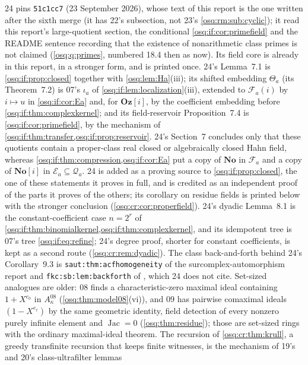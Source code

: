 \documentclass[11pt,letterpaper]{article}
\numberwithin{equation}{section}
\theoremstyle{definition}
\theoremstyle{remark}
\theoremstyle{plain}
\newcommand{\No}{\mathbf{No}}
\newcommand{\Oz}{\mathbf{Oz}}
\newcommand{\SC}{\No[i]}
\newcommand{\GOz}{\Oz[i]}
\newcommand{\FF}{\mathscr F}         %
\newcommand{\EE}{\mathscr E}         %
\newcommand{\Qa}{\mathcal Q}         %
\newcommand{\Jac}{\operatorname{Jac}}
\begin{document}
24 pins \texttt{51c1cc7} (23 September 2026), whose text of this report is the one written after the sixth merge (it has 22's subsection, not 23's
\cref{osq:rm:sub:cyclic}); it read this report's large-quotient section, the conditional \cref{osq:if:cor:primefield} and the README sentence recording
that the existence of nonarithmetic class primes is not claimed (\cref{osq:q:primes}, numbered 18.4 then as now). Its field core is already in
this report, in a stronger form, and is printed once. 24's Lemma~7.1 is \cref{osq:if:prop:closed} together with \cref{osq:lem:Ha}(iii); its
shifted embedding $\Theta_a$ (its Theorem~7.2) is 07's $\iota_a$ of \cref{osq:if:lem:localization}(iii), extended to $\FF_a(i)$ by $i\mapsto u$ in
\cref{osq:if:cor:Ea} and, for $\GOz$, by the coefficient embedding before \cref{osq:if:thm:complexkernel}; and its field-reservoir Proposition~7.4 is
\cref{osq:if:cor:primefield}, by the mechanism of \cref{osq:if:thm:transfer,osq:if:prop:reservoir}. 24's Section~7 concludes only that these
quotients contain a proper-class real closed or algebraically closed Hahn field, whereas \cref{osq:if:thm:compression,osq:if:cor:Ea} put a copy of $\No$
in $\FF_a$ and a copy of $\SC$ in $\EE_a\subseteq\Qa_a$. 24 is added as a proving source to \cref{osq:if:prop:closed}, the one of these statements
it proves in full, and is credited as an independent proof of the parts it proves of the others; its corollary on residue fields is printed below with
the stronger conclusion (\cref{osq:cr:cor:properfield}). 24's dyadic Lemma~8.1 is the constant-coefficient case $n=2^r$ of
\cref{osq:if:thm:binomialkernel,osq:if:thm:complexkernel}, and its idempotent tree is 07's tree \eqref{osq:if:eq:refine}; 24's degree proof, shorter for
constant coefficients, is kept as a second route (\cref{osq:cr:rem:dyadic}). The class back-and-forth behind 24's Corollary~9.3 is
\nolinkurl{saut:thm:acfhomogeneity} of the surcomplex-automorphism report \cite{RepoSaut} and \nolinkurl{fkc:sb:lem:backforth} of \cite{RepoFKC}, which
24 does not cite. Set-sized analogues are older: 08 finds a characteristic-zero maximal ideal containing $1+X^{e_0}$ in $A^{08}_\kappa$
(\cref{osq:thm:model08}(vi)), and 09 has pairwise comaximal ideals $(1-X^{e_\ell})$ by the same geometric identity, field detection of every nonzero
purely infinite element and $\Jac=0$ (\cref{osq:thm:residue}); those are set-sized rings with the ordinary maximal-ideal theorem. The recursion of
\cref{osq:cr:thm:krull}, a greedy transfinite recursion that keeps finite witnesses, is the mechanism of 19's and 20's class-ultrafilter lemmas
\end{document}

